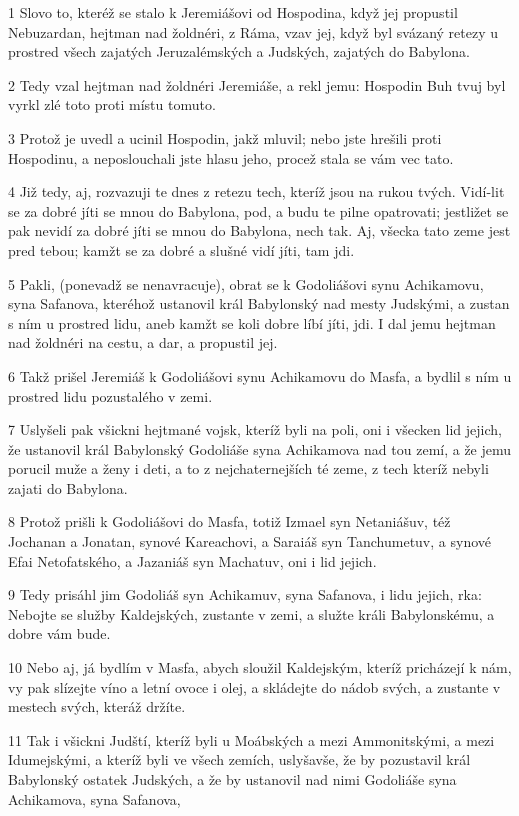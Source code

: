 \par 1 Slovo to, kteréž se stalo k Jeremiášovi od Hospodina, když jej propustil Nebuzardan, hejtman nad žoldnéri, z Ráma, vzav jej, když byl svázaný retezy u prostred všech zajatých Jeruzalémských a Judských, zajatých do Babylona.
\par 2 Tedy vzal hejtman nad žoldnéri Jeremiáše, a rekl jemu: Hospodin Buh tvuj byl vyrkl zlé toto proti místu tomuto.
\par 3 Protož je uvedl a ucinil Hospodin, jakž mluvil; nebo jste hrešili proti Hospodinu, a neposlouchali jste hlasu jeho, procež stala se vám vec tato.
\par 4 Již tedy, aj, rozvazuji te dnes z retezu tech, kteríž jsou na rukou tvých. Vidí-lit se za dobré jíti se mnou do Babylona, pod, a budu te pilne opatrovati; jestližet se pak nevidí za dobré jíti se mnou do Babylona, nech tak. Aj, všecka tato zeme jest pred tebou; kamžt se za dobré a slušné vidí jíti, tam jdi.
\par 5 Pakli, (ponevadž se nenavracuje), obrat se k Godoliášovi synu Achikamovu, syna Safanova, kteréhož ustanovil král Babylonský nad mesty Judskými, a zustan s ním u prostred lidu, aneb kamžt se koli dobre líbí jíti, jdi. I dal jemu hejtman nad žoldnéri na cestu, a dar, a propustil jej.
\par 6 Takž prišel Jeremiáš k Godoliášovi synu Achikamovu do Masfa, a bydlil s ním u prostred lidu pozustalého v zemi.
\par 7 Uslyšeli pak všickni hejtmané vojsk, kteríž byli na poli, oni i všecken lid jejich, že ustanovil král Babylonský Godoliáše syna Achikamova nad tou zemí, a že jemu porucil muže a ženy i deti, a to z nejchaternejších té zeme, z tech kteríž nebyli zajati do Babylona.
\par 8 Protož prišli k Godoliášovi do Masfa, totiž Izmael syn Netaniášuv, též Jochanan a Jonatan, synové Kareachovi, a Saraiáš syn Tanchumetuv, a synové Efai Netofatského, a Jazaniáš syn Machatuv, oni i lid jejich.
\par 9 Tedy prisáhl jim Godoliáš syn Achikamuv, syna Safanova, i lidu jejich, rka: Nebojte se služby Kaldejských, zustante v zemi, a služte králi Babylonskému, a dobre vám bude.
\par 10 Nebo aj, já bydlím v Masfa, abych sloužil Kaldejským, kteríž pricházejí k nám, vy pak slízejte víno a letní ovoce i olej, a skládejte do nádob svých, a zustante v mestech svých, kteráž držíte.
\par 11 Tak i všickni Judští, kteríž byli u Moábských a mezi Ammonitskými, a mezi Idumejskými, a kteríž byli ve všech zemích, uslyšavše, že by pozustavil král Babylonský ostatek Judských, a že by ustanovil nad nimi Godoliáše syna Achikamova, syna Safanova,
